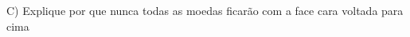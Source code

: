 \documentclass[preview]{standalone}
\begin{document}
\begin{center}
C) Explique por que nunca todas as moedas ficarão com a face cara voltada para cima
\end{center}
\end{document}
